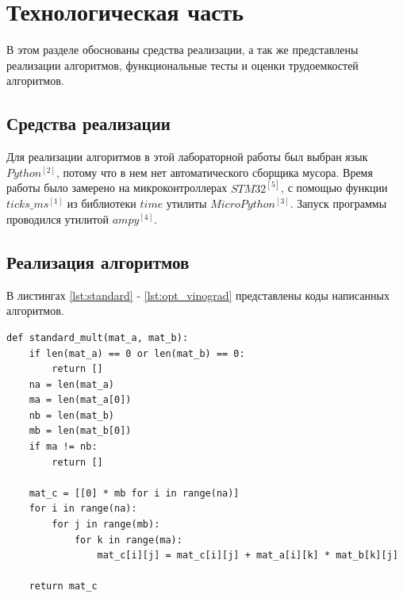 \documentclass{article}
\begin{document}
\clearpage\section{Технологическая часть}
В этом разделе обоснованы средства реализации, а так же представлены реализации алгоритмов, функциональные тесты
и оценки трудоемкостей алгоритмов.

\subsection{Средства реализации}
Для реализации алгоритмов в этой лабораторной работы был выбран язык $Python^{[2]}$, потому что в нем нет 
автоматического сборщика мусора. Время работы было замерено на микроконтроллерах $STM32^{[5]}$, с помощью функции
$ticks\_ms^{[1]}$ из библиотеки $time$ утилиты $MicroPython^{[3]}$. Запуск программы проводился утилитой $ampy^{[4]}$.

\subsection{Реализация алгоритмов}
В листингах \ref{lst:standard} - \ref{lst:opt_vinograd} представлены коды написанных алгоритмов.

\begin{lstlisting}[style=python, label=lst:standard,caption=Стандратный алгоритм умножения матриц]
def standard_mult(mat_a, mat_b):
    if len(mat_a) == 0 or len(mat_b) == 0:
        return []
    na = len(mat_a)
    ma = len(mat_a[0])
    nb = len(mat_b)
    mb = len(mat_b[0])
    if ma != nb:
        return []

    mat_c = [[0] * mb for i in range(na)]
    for i in range(na):
        for j in range(mb):
            for k in range(ma):
                mat_c[i][j] = mat_c[i][j] + mat_a[i][k] * mat_b[k][j]

    return mat_c
\end{lstlisting}
\end{document}
